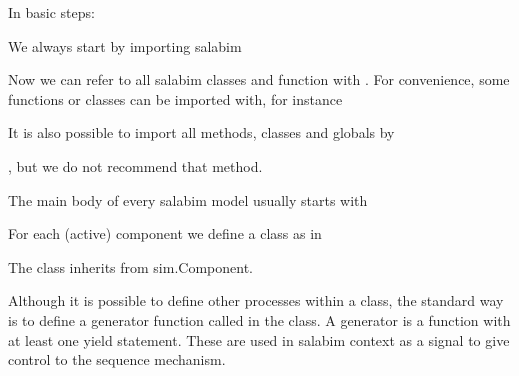 \documentclass[letterpaper,10pt,english]{sphinxmanual}
\begin{document}
In basic steps:

We always start by importing salabim

%
\begin{sphinxVerbatim}[commandchars=\\\{\}]
   
\end{sphinxVerbatim}

Now we can refer to all salabim classes and function with .
For convenience, some functions or classes can be imported with, for instance

%
\begin{sphinxVerbatim}[commandchars=\\\{\}]
     
\end{sphinxVerbatim}

It is also possible to import all methods, classes and globals by

%
\begin{sphinxVerbatim}[commandchars=\\\{\}]
   
\end{sphinxVerbatim}

, but we do not recommend that method.

The main body of every salabim model usually starts with

%
\begin{sphinxVerbatim}[commandchars=\\\{\}]
  
\end{sphinxVerbatim}

For each (active) component we define a class as in

%
\begin{sphinxVerbatim}[commandchars=\\\{\}]
 
\end{sphinxVerbatim}

The class inherits from sim.Component.

Although it is possible to define other processes within a class,
the standard way is to define a generator function called  in the class.
A generator is a function with at least one yield statement. These are used in salabim context as
a signal to give control to the sequence mechanism.
\end{document}
